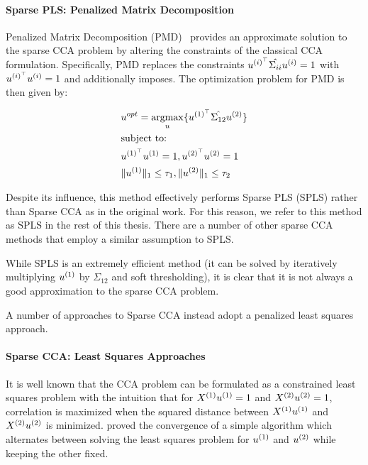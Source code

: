 \paragraph{Sparse PLS: Penalized Matrix Decomposition}
Penalized Matrix Decomposition (PMD)~\citep{witten2009penalized} provides an approximate solution to the sparse CCA problem by altering the constraints of the classical CCA formulation.
Specifically, PMD replaces the constraints \(u^{(i)^{\top}} \hat{\Sigma_{ii}} u^{(i)} = 1\) with \(u^{(i)^{\top}} u^{(i)}= 1\) and additionally imposes.
The optimization problem for PMD is then given by:

\begin{align}
    & u^{opt}=\underset{u}{\mathrm{argmax}}\{ u^{(1)^{\top}} \hat{\Sigma_{12}} u^{(2)} \} \\
    & \text{subject to:} \notag \\
    & u^{(1)^{\top}} u^{(1)} = 1 , u^{(2)^{\top}} u^{(2)} = 1 \notag \\
    & \|u^{(1)}\|_1 \leq \tau_1 , \|u^{(2)}\|_1 \leq \tau_2 \notag
\end{align}

Despite its influence, this method effectively performs Sparse PLS (SPLS) rather than Sparse CCA as in the original work.
For this reason, we refer to this method as SPLS in the rest of this thesis.
There are a number of other sparse CCA methods that employ a similar assumption to SPLS\citep{parkhomenko2009sparse, waaijenborg2008quantifying}.

While SPLS is an extremely efficient method (it can be solved by iteratively multiplying $u^{(1)}$ by $\hat{\Sigma_{12}}$ and soft thresholding), it is clear that it is not always a good approximation to the sparse CCA problem.

A number of approaches to Sparse CCA instead adopt a penalized least squares approach.

\paragraph{Sparse CCA: Least Squares Approaches}

It is well known that the CCA problem can be formulated as a constrained least squares problem with the intuition that
for \(X^{(1)} u^{(1)}=1\) and \(X^{(2)} u^{(2)}=1\), correlation is maximized when the squared distance
between \(X^{(1)} u^{(1)}\) and \(X^{(2)} u^{(2)}\) is minimized. \citep{golub1995canonical} proved the
convergence of a simple algorithm which alternates between solving the least squares problem for \(u^{(1)}\) and
\(u^{(2)}\) while keeping the other fixed.

